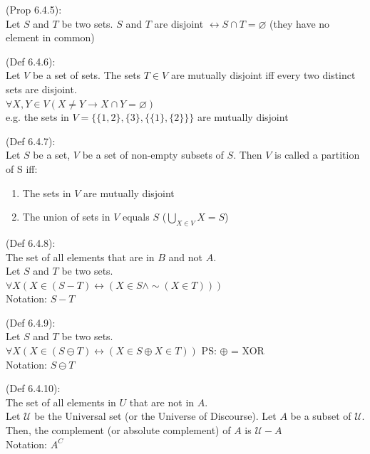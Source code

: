 \documentclass[10pt,landscape,a4paper]{article}
\newenvironment{descitemize} %
{\begin{description}[leftmargin=*,before=\let\makelabel\descitemlabel]}
	{\end{description}}
\newcommand{\descitemlabel}[1]{%
	\textbullet\ \textbf{#1}%
}
\begin{document}
\begin{multicols*}{4}
\begin{descitemize}
			\item [Disjoint] (Prop 6.4.5):\\
			Let $S$ and $T$ be two sets. $S$ and $T$ are disjoint $\leftrightarrow S \cap T = \varnothing$ (they have no element in common)
			
			\item [Mutually Disjoint] (Def 6.4.6):\\
			Let $V$ be a set of sets. The sets $T \in V$ are mutually disjoint iff every two distinct sets are disjoint.\\
			$\forall X, Y \in V (X\neq Y \rightarrow X \cap Y = \varnothing)$\\
			e.g. the sets in $V=\{ \{1,2\},\{3\}, \{\{1\},\{2\}\} \}$ are mutually disjoint
			
			\item [Partition] (Def 6.4.7):\\
			Let $S$ be a set, $V$ be a set of non-empty subsets of $S$. Then $V$ is called a partition of S iff:
			\begin{enumerate}
				\item The sets in $V$ are mutually disjoint
				\item The union of sets in $V$ equals $S$ ($\bigcup\limits_{X\in V}^{}X=S$)
			\end{enumerate}
			
			\item [Non-symmetric difference] (Def 6.4.8):\\
			The set of all elements that are in $B$ and not $A$.\\
			Let $S$ and $T$ be two sets.\\
			$\forall X(X \in (S-T) \leftrightarrow (X\in S \land \sim(X\in T)))$\\
			Notation: $S - T$
			
			\item [Symmetric difference] (Def 6.4.9):\\
			Let $S$ and $T$ be two sets.\\
			$\forall X(X \in (S \ominus T) \leftrightarrow (X\in S \oplus X\in T))$ PS: $\oplus$ = XOR\\
			Notation: $S\ominus T$
			
			\item [Set complement] (Def 6.4.10):\\
			The set of all elements in $U$ that are not in $A$.\\
			Let $\mathcal{U}$ be the Universal set (or the Universe of Discourse). Let $A$ be a subset of $\mathcal{U}$. Then, the complement (or absolute complement) of $A$ is $\mathcal{U} - A$\\
			Notation: $A^C$
			

\end{descitemize}
\end{multicols*}
\end{document}
